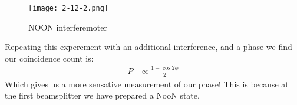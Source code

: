 \begin{figure*}[h]
	\centering
	\texttt{[image: 2-12-2.png]}
	\caption*{NOON interferemoter}
\end{figure*}
Repeating this experement with an additional interference, and a phase we find our coincidence count is:
\begin{align*}
	P &\propto \frac{1-\cos2\phi}{2}
\end{align*}
Which gives us a more sensative measurement of our phase! This is because at the first beamsplitter we have prepared a NooN state.
